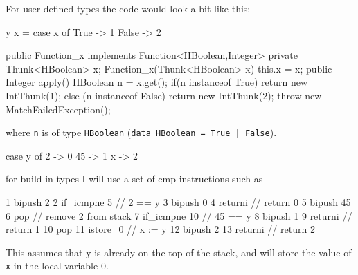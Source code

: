 \documentclass[12pt,a4paper,twoside]{article}
\begin{document}
For user defined types the code would look a bit like this:

\begin{HaskellLst}
y x = case x of
  True  -> 1
  False -> 2
\end{HaskellLst}

\begin{JavaLst}
public Function_x implements Function<HBoolean,Integer> {
  private Thunk<HBoolean> x;
  Function_x(Thunk<HBoolean> x) {this.x = x;}
  public Integer apply() {
    HBoolean n = x.get();
    if(n instanceof True) {
      return new IntThunk(1);
    } else (n instanceof False) {
      return new IntThunk(2);
    }
    throw new MatchFailedException();
  }
}
\end{JavaLst}


where \texttt{n} is of type \texttt{HBoolean} (\texttt{data HBoolean = True | False}).


\begin{HaskellLst}
case y of
  2  -> 0
  45 -> 1
  x  -> 2
\end{HaskellLst}

for build-in types I will use a set of cmp instructions such as

\begin{JVMLst}
1  bipush 2       
2  if_icmpne 5   // 2 == y
3  bipush 0      
4  returni       // return 0
5  bipush 45
6  pop           // remove 2 from stack
7  if_icmpne 10  // 45 == y
8  bipush 1    
9  returni       // return 1
10 pop
11 istore_0      // x := y
12 bipush 2      
13 returni       // return 2
\end{JVMLst}

This assumes that y is already on the top of the stack, and will store the value of \texttt{x} in the local
variable 0.
\end{document}
